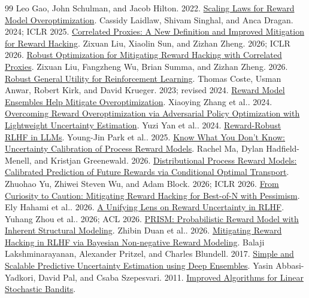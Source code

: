 \begin{thebibliography}{99}
 Leo Gao, John Schulman, and Jacob Hilton. 2022. \href{https://arxiv.org/abs/2210.10760}{Scaling Laws for Reward Model Overoptimization}.
 Cassidy Laidlaw, Shivam Singhal, and Anca Dragan. 2024; ICLR 2025. \href{https://arxiv.org/abs/2403.03185}{Correlated Proxies: A New Definition and Improved Mitigation for Reward Hacking}.
 Zixuan Liu, Xiaolin Sun, and Zizhan Zheng. 2026; ICLR 2026. \href{https://proceedings.iclr.cc/paper_files/paper/2026/hash/0904c7edde20d7134a77fc7f9cd86ea2-Abstract-Conference.html}{Robust Optimization for Mitigating Reward Hacking with Correlated Proxies}.
 Zixuan Liu, Fangzheng Wu, Brian Summa, and Zizhan Zheng. 2026. \href{https://arxiv.org/abs/2608.03562}{Robust General Utility for Reinforcement Learning}.
 Thomas Coste, Usman Anwar, Robert Kirk, and David Krueger. 2023; revised 2024. \href{https://arxiv.org/abs/2310.02743}{Reward Model Ensembles Help Mitigate Overoptimization}.
 Xiaoying Zhang et al.. 2024. \href{https://arxiv.org/abs/2403.05171}{Overcoming Reward Overoptimization via Adversarial Policy Optimization with Lightweight Uncertainty Estimation}.
 Yuzi Yan et al.. 2024. \href{https://arxiv.org/abs/2409.15360}{Reward-Robust RLHF in LLMs}.
 Young-Jin Park et al.. 2025. \href{https://arxiv.org/abs/2506.09338}{Know What You Don't Know: Uncertainty Calibration of Process Reward Models}.
 Rachel Ma, Dylan Hadfield-Menell, and Kristjan Greenewald. 2026. \href{https://arxiv.org/abs/2605.06785}{Distributional Process Reward Models: Calibrated Prediction of Future Rewards via Conditional Optimal Transport}.
 Zhuohao Yu, Zhiwei Steven Wu, and Adam Block. 2026; ICLR 2026. \href{https://arxiv.org/abs/2604.04648}{From Curiosity to Caution: Mitigating Reward Hacking for Best-of-N with Pessimism}.
 Ely Hahami et al.. 2026. \href{https://arxiv.org/abs/2606.09073}{A Unifying Lens on Reward Uncertainty in RLHF}.
 Yuhang Zhou et al.. 2026; ACL 2026. \href{https://aclanthology.org/2026.acl-long.563/}{PRISM: Probabilistic Reward Model with Inherent Structural Modeling}.
 Zhibin Duan et al.. 2026. \href{https://arxiv.org/abs/2602.10623}{Mitigating Reward Hacking in RLHF via Bayesian Non-negative Reward Modeling}.
 Balaji Lakshminarayanan, Alexander Pritzel, and Charles Blundell. 2017. \href{https://arxiv.org/abs/1612.01474}{Simple and Scalable Predictive Uncertainty Estimation using Deep Ensembles}.
 Yasin Abbasi-Yadkori, David Pal, and Csaba Szepesvari. 2011. \href{https://proceedings.neurips.cc/paper/2011/file/e1d5be1c7f2f456670de3d53c7b54f4a-Paper.pdf}{Improved Algorithms for Linear Stochastic Bandits}.

\end{thebibliography}

